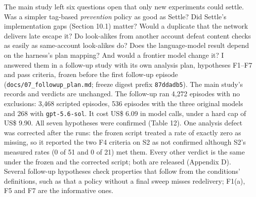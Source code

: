 \documentclass[
  10pt,
]{article}
\begin{document}
The main study left six questions open that only new experiments could
settle. Was a simpler tag-based \emph{prevention} policy as good as
Settle? Did Settle's implementation gaps (Section 10.1) matter? Would a
duplicate that the network delivers late escape it? Do look-alikes from
another account defeat content checks as easily as same-account
look-alikes do? Does the language-model result depend on the harness's
plan mapping? And would a frontier model change it? I answered them in a
follow-up study with its own analysis plan, hypotheses F1--F7 and pass
criteria, frozen before the first follow-up episode
(\texttt{docs/07\_followup\_plan.md}; freeze digest prefix
\texttt{87ddadb5}). The main study's records and verdicts are unchanged.
The follow-up ran 4,272 episodes with no exclusions: 3,468 scripted
episodes, 536 episodes with the three original models and 268 with
\texttt{gpt-5.6-sol}. It cost US\$ 6.09 in model calls, under a hard cap
of US\$ 9.90. All seven hypotheses were confirmed (Table 12). One
analysis defect was corrected after the runs: the frozen script treated
a rate of exactly zero as missing, so it reported the two F4 criteria on
S2 as not confirmed although S2's measured rates (0 of 51 and 0 of 21)
met them. Every other verdict is the same under the frozen and the
corrected script; both are released (Appendix D). Several follow-up
hypotheses check properties that follow from the conditions'
definitions, such as that a policy without a final sweep misses
redelivery; F1(a), F5 and F7 are the informative ones.
\end{document}
